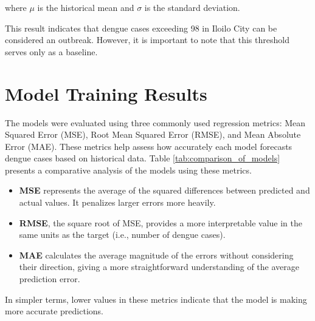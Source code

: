 where \(\mu\) is the historical mean and \(\sigma \) is the standard deviation.

This result indicates that dengue cases exceeding 98 in Iloilo City can be considered an outbreak. However, it is important to note that this threshold serves only as a baseline. 

\section{Model Training Results}

The models were evaluated using three commonly used regression metrics: Mean Squared Error (MSE), Root Mean Squared Error (RMSE), and Mean Absolute Error (MAE). These metrics help assess how accurately each model forecasts dengue cases based on historical data. Table \ref{tab:comparison_of_models} presents a comparative analysis of the models using these metrics.
\begin{itemize}
	\item \textbf{MSE} represents the average of the squared differences between predicted and actual values. It penalizes larger errors more heavily.
	\item \textbf{RMSE}, the square root of MSE, provides a more interpretable value in the same units as the target (i.e., number of dengue cases).
	\item \textbf{MAE} calculates the average magnitude of the errors without considering their direction, giving a more straightforward understanding of the average prediction error.
\end{itemize}

In simpler terms, lower values in these metrics indicate that the model is making more accurate predictions.

